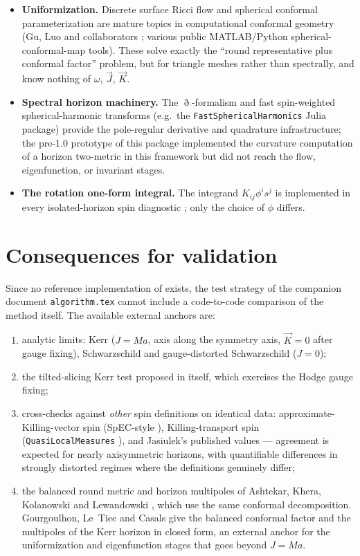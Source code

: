 \documentclass[11pt]{article}
\newcommand{\vJ}{\vec{J}}
\newcommand{\vK}{\vec{K}}
\begin{document}
\begin{itemize}
\item \textbf{Uniformization.}  Discrete surface Ricci flow and spherical
  conformal parameterization are mature topics in computational conformal
  geometry (Gu, Luo and collaborators \cite{gu2008}; various public
  MATLAB/Python spherical-conformal-map tools).  These solve exactly the
  ``round representative plus conformal factor'' problem, but for triangle
  meshes rather than spectrally, and know nothing of $\omega$, $\vJ$,
  $\vK$.
\item \textbf{Spectral horizon machinery.}  The $\eth$-formalism
  \cite{gomez1997} and fast spin-weighted spherical-harmonic transforms
  (e.g.\ the \texttt{FastSphericalHarmonics} Julia package) provide the
  pole-regular derivative and quadrature infrastructure; the pre-1.0
  prototype of this package implemented the curvature computation of
  a horizon two-metric in this framework but did not reach the flow,
  eigenfunction, or invariant stages.
\item \textbf{The rotation one-form integral.}  The integrand
  $K_{ij}\phi^i s^j$ is implemented in every isolated-horizon spin
  diagnostic \cite{dkss2003,qlm}; only the choice of $\phi$ differs.
\end{itemize}

\section{Consequences for validation}

Since no reference implementation of \cite{korzynski2007} exists, the test
strategy of the companion document \texttt{algorithm.tex} cannot include a
code-to-code comparison of the method itself.  The available external
anchors are:
\begin{enumerate}
\item analytic limits: Kerr ($J=Ma$, axis along the symmetry axis,
  $\vK=0$ after gauge fixing), Schwarzschild and gauge-distorted
  Schwarzschild ($J=0$);
\item the tilted-slicing Kerr test proposed in \cite{korzynski2007} itself,
  which exercises the Hodge gauge fixing;
\item cross-checks against \emph{other} spin definitions on identical data:
  approximate-Killing-vector spin (SpEC-style \cite{cookwhiting2007}),
  Killing-transport spin (\texttt{QuasiLocalMeasures} \cite{qlm}), and
  Jasiulek's published values \cite{jasiulek2009} --- agreement is expected
  for nearly axisymmetric horizons, with quantifiable differences in
  strongly distorted regimes where the definitions genuinely differ;
\item the balanced round metric and horizon multipoles of Ashtekar, Khera,
  Kolanowski and Lewandowski \cite{ashtekar2022}, which use the same
  conformal decomposition.  Gourgoulhon, Le~Tiec and Casals
  \cite{glc2026} give the balanced conformal factor and the multipoles of
  the Kerr horizon in closed form, an external anchor for the uniformization
  and eigenfunction stages that goes beyond $J=Ma$.
\end{enumerate}
\end{document}
